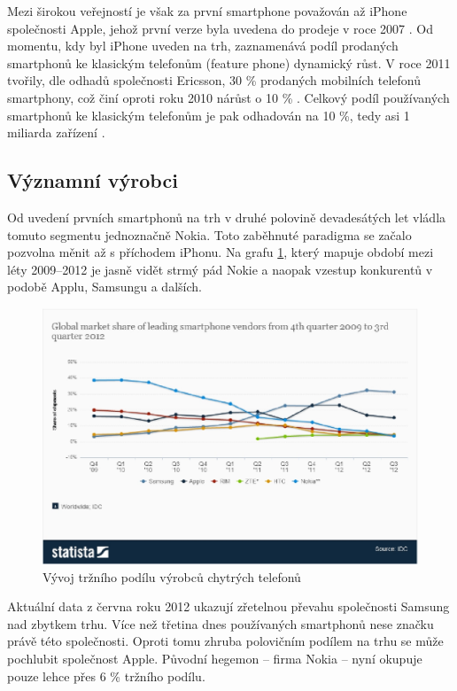 Mezi širokou veřejností je však za první smartphone považován až iPhone společnosti Apple, jehož první verze byla uvedena do prodeje v roce 2007 \cite{apple_unveils_iPhone}. Od momentu, kdy byl iPhone uveden na trh, zaznamenává podíl prodaných smartphonů ke klasickým telefonům (feature phone) dynamický růst. V roce 2011 tvořily, dle odhadů společnosti Ericsson, 30 \% prodaných mobilních telefonů smartphony, což činí oproti roku 2010 nárůst o 10 \% \cite{ericsson_report_web}. Celkový podíl používaných smartphonů ke klasickým telefonům je pak odhadován na 10 \%, tedy asi 1 miliarda zařízení \cite{ericsson_report_web}.

\subsection{Významní výrobci}
Od uvedení prvních smartphonů na trh v druhé polovině devadesátých let vládla tomuto segmentu jednoznačně Nokia. Toto zaběhnuté paradigma se začalo pozvolna měnit až s příchodem iPhonu. Na grafu \ref{fig:VyrobciSmartphoneRozsireni}, který mapuje období mezi léty 2009–2012 je jasně vidět strmý pád Nokie a naopak vzestup konkurentů v podobě Applu, Samsungu a dalších.

\begin{figure}\centering
\includegraphics[width=1.0\textwidth]{smartphone_marketshare_vendors.eps}
\caption{Vývoj tržního podílu výrobců chytrých telefonů}
\label{fig:VyrobciSmartphoneRozsireni}
\end{figure}

Aktuální data z června roku 2012 ukazují zřetelnou převahu společnosti Samsung nad zbytkem trhu. Více než třetina dnes používaných smartphonů nese značku právě této společnosti. Oproti tomu zhruba polovičním podílem na trhu se může pochlubit společnost Apple. Původní hegemon – firma Nokia – nyní okupuje pouze lehce přes 6 \% tržního podílu.

